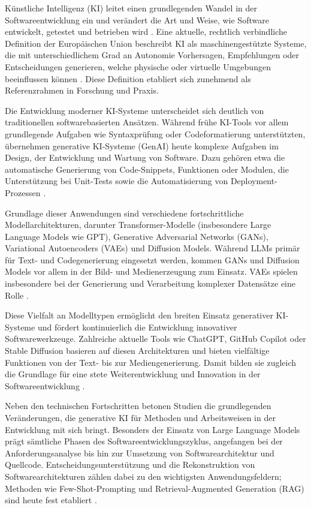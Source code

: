 
Künstliche Intelligenz (KI) leitet einen grundlegenden Wandel in der
Softwareentwicklung ein und verändert die Art und Weise, wie Software
entwickelt, getestet und betrieben wird \cite{esposito_generative_2025}. Eine
aktuelle, rechtlich verbindliche Definition der Europäischen Union beschreibt
KI als maschinengestützte Systeme, die mit unterschiedlichem Grad an Autonomie
Vorhersagen, Empfehlungen oder Entscheidungen generieren, welche physische oder
virtuelle Umgebungen beeinflussen können \cite{noauthor_verordnung_nodate}.
Diese Definition etabliert sich zunehmend als Referenzrahmen in Forschung und
Praxis.

Die Entwicklung moderner KI-Systeme unterscheidet sich deutlich von
traditionellen softwarebasierten Ansätzen. Während frühe KI-Tools vor allem
grundlegende Aufgaben wie Syntaxprüfung oder Codeformatierung unterstützten,
übernehmen generative KI-Systeme (GenAI) heute komplexe Aufgaben im Design, der
Entwicklung und Wartung von Software. Dazu gehören etwa die automatische
Generierung von Code-Snippets, Funktionen oder Modulen, die Unterstützung bei
Unit-Tests sowie die Automatisierung von Deployment-Prozessen
\cite{donvir_role_2024}.

Grundlage dieser Anwendungen sind verschiedene fortschrittliche
Modellarchitekturen, darunter Transformer-Modelle (insbesondere Large Language
Models wie GPT), Generative Adversarial Networks (GANs), Variational
Autoencoders (VAEs) und Diffusion Models. Während LLMs primär für Text- und
Codegenerierung eingesetzt werden, kommen GANs und Diffusion Models vor allem
in der Bild- und Medienerzeugung zum Einsatz. VAEs spielen insbesondere bei der
Generierung und Verarbeitung komplexer Datensätze eine Rolle
\cite{donvir_role_2024}.

Diese Vielfalt an Modelltypen ermöglicht den breiten Einsatz generativer
KI-Systeme und fördert kontinuierlich die Entwicklung innovativer
Softwarewerkzeuge. Zahlreiche aktuelle Tools wie ChatGPT, GitHub Copilot oder
Stable Diffusion basieren auf diesen Architekturen und bieten vielfältige
Funktionen von der Text- bis zur Mediengenerierung. Damit bilden sie zugleich
die Grundlage für eine stete Weiterentwicklung und Innovation in der
Softwareentwicklung \cite{donvir_role_2024}.

Neben den technischen Fortschritten betonen Studien die grundlegenden
Veränderungen, die generative KI für Methoden und Arbeitsweisen in der
Entwicklung mit sich bringt. Besonders der Einsatz von Large Language Models
prägt sämtliche Phasen des Softwareentwicklungszyklus, angefangen bei der
Anforderungsanalyse bis hin zur Umsetzung von Softwarearchitektur und
Quellcode. Entscheidungsunterstützung und die Rekonstruktion von
Softwarearchitekturen zählen dabei zu den wichtigsten Anwendungsfeldern;
Methoden wie Few-Shot-Prompting und Retrieval-Augmented Generation (RAG) sind
heute fest etabliert \cite{esposito_generative_2025}.

